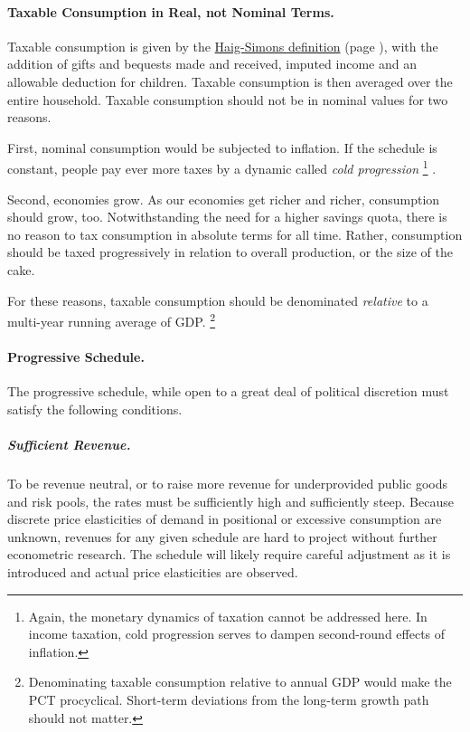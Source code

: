 \paragraph{Taxable Consumption in Real, not Nominal Terms.}
Taxable consumption is given by the \hyperref[eq:HaigSimonsPCT]{Haig-Simons definition} (page \pageref{eq:HaigSimonsPCT}), with the addition of gifts and bequests made and received, imputed income and an allowable deduction for children.
Taxable consumption is then averaged over the entire household.
Taxable consumption should not be in nominal values for two reasons.

First, nominal consumption would be subjected to inflation.
If the schedule is constant, people pay ever more taxes by a dynamic called \emph{cold progression}
\footnote{
	Again, the monetary dynamics of taxation cannot be addressed here.
	In income taxation, cold progression serves to dampen second-round effects of inflation.
}
.

Second, economies grow.
As our economies get richer and richer, consumption should grow, too.
Notwithstanding the need for a higher savings quota, there is no reason to tax consumption in absolute terms for all time.
Rather, consumption should be taxed progressively in relation to overall production, or the size of the cake.

For these reasons, taxable consumption should be denominated \emph{relative} to a multi-year running average of GDP.
\footnote{
	Denominating taxable consumption relative to annual GDP would make the PCT procyclical.
	Short-term deviations from the long-term growth path should not matter.
}

\paragraph{Progressive Schedule.}
The progressive schedule, while open to a great deal of political discretion must satisfy the following conditions.

\subparagraph{Sufficient Revenue.}
To be revenue neutral, or to raise more revenue for underprovided public goods and risk pools, the rates must be sufficiently high and sufficiently steep.
Because discrete price elasticities of demand in positional or excessive consumption are unknown, revenues for any given schedule are hard to project without further econometric research.
The schedule will likely require careful adjustment as it is introduced and actual price elasticities are observed.

